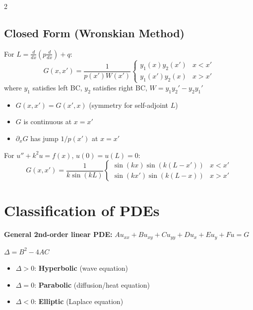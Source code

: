 \documentclass[10pt,a4paper]{article}
\begin{document}
\begin{multicols}{2}
\subsection{Closed Form (Wronskian Method)}
For $L = \frac{d}{dx}\left(p\frac{d}{dx}\right) + q$:
\begin{equation}
G(x,x') = \frac{1}{p(x')W(x')}\begin{cases} y_1(x)y_2(x') & x < x' \\ y_1(x')y_2(x) & x > x' \end{cases}
\end{equation}
where $y_1$ satisfies left BC, $y_2$ satisfies right BC, $W = y_1 y_2' - y_2 y_1'$

\begin{warning}
\begin{itemize}
    \item $G(x,x') = G(x',x)$ (symmetry for self-adjoint $L$)
    \item $G$ is continuous at $x=x'$
    \item $\partial_x G$ has jump $1/p(x')$ at $x=x'$
\end{itemize}
\end{warning}

\begin{example}
For $u'' + k^2 u = f(x)$, $u(0)=u(L)=0$:
\begin{equation}
G(x,x') = \frac{1}{k\sin(kL)}\begin{cases} \sin(kx)\sin(k(L-x')) & x<x' \\ \sin(kx')\sin(k(L-x)) & x>x' \end{cases}
\end{equation}
\end{example}

\section{Classification of PDEs}

\textbf{General 2nd-order linear PDE:}
$Au_{xx} + Bu_{xy} + Cu_{yy} + Du_x + Eu_y + Fu = G$

\begin{keyformula}
$\Delta = B^2 - 4AC$
\begin{itemize}
    \item $\Delta > 0$: \textbf{Hyperbolic} (wave equation)
    \item $\Delta = 0$: \textbf{Parabolic} (diffusion/heat equation)
    \item $\Delta < 0$: \textbf{Elliptic} (Laplace equation)
\end{itemize}
\end{keyformula}


\end{multicols}
\end{document}
